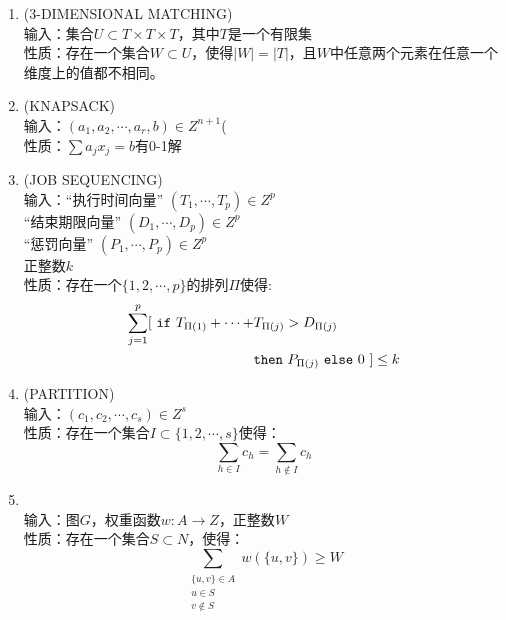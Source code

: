 \documentclass[twocolumn]{article}
\theoremstyle{nonumberplain}%
\begin{document}
\begin{CJK}{UTF8}{gbsn}
\begin{enumerate}
    \item {(3-DIMENSIONAL MATCHING)}\\
    输入：集合$U\subset T\times T\times T$，其中$T$是一个有限集\\
    性质：存在一个集合$W\subset U$，使得$|W|=|T|$，且$W$中任意两个元素在任意一个维度上的值都不相同。

    \item {(KNAPSACK)}\\
    输入：$(a_1,a_2,\cdots,a_r,b)\in Z^{n+1}$(\\
    性质：$\sum a_j x_j=b$有0-1解

    \item {(JOB SEQUENCING)}\\
    输入：“执行时间向量” $(T_1,\cdots,T_p)\in Z^p$\\
    \hphantom{输入：}“结束期限向量” $(D_1,\cdots,D_p)\in Z^p$\\
    \hphantom{输入：}“惩罚向量” $(P_1,\cdots,P_p)\in Z^p$\\
    \hphantom{输入：}正整数$k$\\
    性质：存在一个$\{1,2,\cdots,p\}$的排列$\Pi$使得:
    \begin{equation}\nonumber
        \begin{aligned}
            \sum_{j=1}^{p} [ \ {\tt if}\  T_{\Pi(1)}+\cdots+&T_{\Pi(j)} > D_{\Pi(j)} \\
                            & {\tt then} \  P_{\Pi(j)}\ {\tt else}\  0 \  ] \leq k
        \end{aligned}
    \end{equation}

    \item {(PARTITION)}\\
    输入：$(c_1,c_2,\cdots,c_s)\in Z^s$\\
    性质：存在一个集合$I\subset\{1,2,\cdots,s\}$使得：
    $$\sum_{h\in I}c_h = \sum_{h\notin I}c_h$$

    \item {}\\
    输入：图$G$，权重函数$w:A\rightarrow Z$，正整数$W$\\
    性质：存在一个集合$S\subset N$，使得：
    $$\sum_{\substack{\{u,v\}\in A \\ u\in S \\ v\notin S}} w(\{u,v\})\ge W$$

    \end{enumerate}


\end{CJK}
\end{document}
